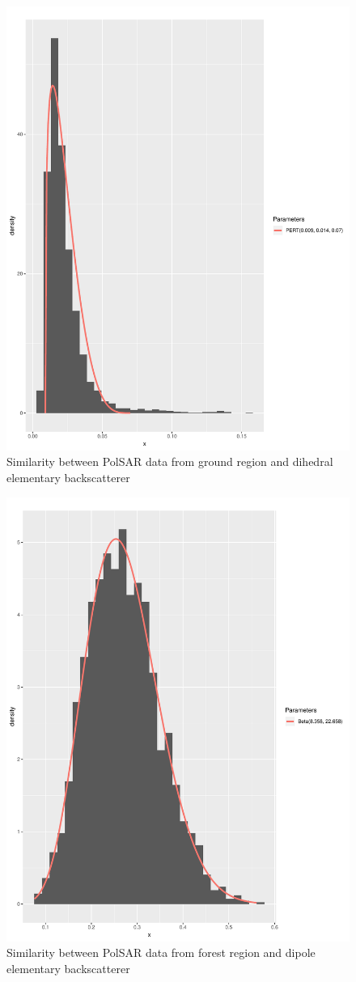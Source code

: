 \documentclass[conference]{IEEEtran}
\begin{document}
\begin{figure}[!ht]
    \centering
    \includegraphics[width = .9\linewidth, height = .7\linewidth]{../../../Figures/paper_19_05/di_ground.pdf}
    \caption{Similarity between PolSAR data from ground region and dihedral elementary backscatterer}
    \label{fig:gr_di}
\end{figure}

\begin{figure}[!ht]
    \centering
    \includegraphics[width = .9\linewidth, height = .7\linewidth]{../../../Figures/paper_19_05/dip_vegetation.pdf}
    \caption{Similarity between PolSAR data from forest region and dipole elementary backscatterer}
    \label{fig:fr_dip}
\end{figure}
\end{document}
